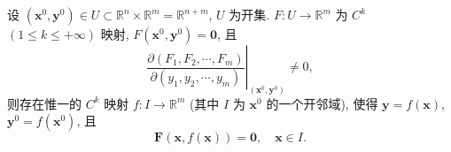 \begin{theorem}[隐射定理]\label{thm:8.5.2}
设 $(\boldsymbol{x}^{0}, \boldsymbol{y}^{0}) \in U \subset \mathbb{R}^{n} \times \mathbb{R}^{m} = \mathbb{R}^{n+m}$, $U$ 为开集. $F: U \to \mathbb{R}^{m}$ 为 $C^{k}$ $(1 \leqslant k \leqslant +\infty)$ 映射, $F(\boldsymbol{x}^{0}, \boldsymbol{y}^{0}) = \boldsymbol{0}$, 且
\[
  \left.\frac{\partial(F_{1}, F_{2}, \cdots, F_{m})}{\partial(y_{1}, y_{2}, \cdots, y_{m})}\right|_{(\boldsymbol{x}^{0}, \boldsymbol{y}^{0})} \neq 0,
\]
则存在惟一的 $C^{k}$ 映射 $f: I \to \mathbb{R}^{m}$ (其中 $I$ 为 $\boldsymbol{x}^{0}$ 的一个开邻域), 使得 $\boldsymbol{y} = f(\boldsymbol{x})$, $\boldsymbol{y}^{0} = f(\boldsymbol{x}^{0})$, 且
\[
  \boldsymbol{F}(\boldsymbol{x}, f(\boldsymbol{x})) = \boldsymbol{0}, \quad \boldsymbol{x} \in I.
\]
\end{theorem}

